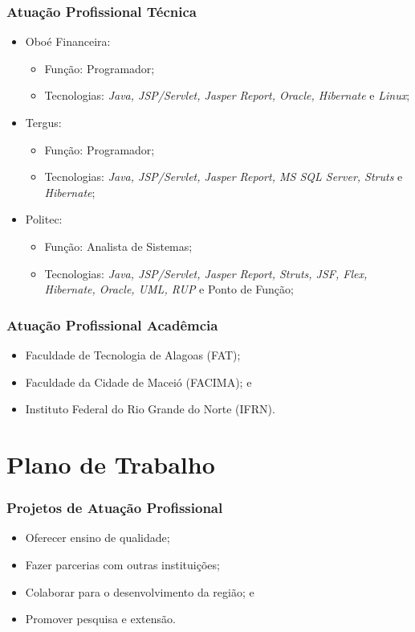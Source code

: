 \documentclass{beamer}
\begin{document}
\begin{frame}
	\frametitle{Atuação Profissional Técnica}
		
	\begin{itemize}
		\item Oboé Financeira:
		\begin{itemize}
			\item Função: Programador;
			\item Tecnologias: \textit{Java, JSP/Servlet, Jasper Report, Oracle, Hibernate} e \textit{Linux};
		\end{itemize}
		
		\item Tergus:
		\begin{itemize}
			\item Função: Programador;
			\item Tecnologias: \textit{Java, JSP/Servlet, Jasper Report, MS SQL Server, Struts} e \textit{Hibernate};
		\end{itemize}
		
		\item Politec:
		\begin{itemize}
			\item Função: Analista de Sistemas;
			\item Tecnologias: \textit{Java, JSP/Servlet, Jasper Report, Struts, JSF, Flex, Hibernate, Oracle, UML, RUP} e Ponto de Função;
		\end{itemize}
	\end{itemize}
\end{frame}

\begin{frame}
	\frametitle{Atuação Profissional Acadêmcia}

	\begin{itemize}
		\item Faculdade de Tecnologia de Alagoas (FAT);
		\item Faculdade da Cidade de Maceió (FACIMA); e
		\item Instituto Federal do Rio Grande do Norte (IFRN).
	\end{itemize}
\end{frame}

\section{Plano de Trabalho}

\begin{frame}
	\frametitle{Projetos de Atuação Profissional}
	
	\begin{itemize}
		\item Oferecer ensino de qualidade;
		\item Fazer parcerias com outras instituições;
		\item Colaborar para o desenvolvimento da região; e
		\item Promover pesquisa e extensão.
	\end{itemize}
\end{frame}
\end{document}
